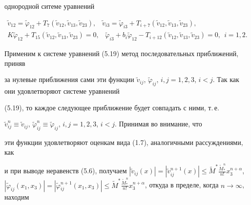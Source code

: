 однородной ситеме уравнений




\begin{equation}


\begin{array}{c}


\widetilde v_{12}=\widetilde \varphi_{12}+T_7(\widetilde v_{12},\widetilde


v_{13},\widetilde v_{23}),\;\;\;\widetilde v_{i3}=\widetilde \varphi_{i3}+


T_{i+7}(\widetilde v_{12},\widetilde v_{13},\widetilde v_{23}), \\[2mm]


K\widetilde \varphi_{12}+T_{15}(\widetilde v_{12},\widetilde v_{13},


\widetilde v_{23})=0,\;\;\;\widetilde \varphi_{i3}+b_i\widetilde \varphi_{12}-


T_{i+12}(\widetilde v_{12},\widetilde v_{13},\widetilde v_{23})=0,\ \ i=1,2.


\end{array}


\end{equation}


Применим к системе уравнений (5.19) метод последовательных приближений, приняв


за нулевые приближения сами эти функции $\widetilde v_{ij}$, $\widetilde


\varphi_{ij}$, $i,j=1,2,3$, $i<j$. Так как они удовлетворяют системе уравнений


(5.19), то каждое следующее приближение будет совпадать с ними, т.\,е.


$\widetilde v_{ij}^n \equiv \widetilde v_{ij}$, $\widetilde \varphi_{ij}^n


\equiv \widetilde \varphi_{ij}$, $i,j=1,2,3$, $i<j$. Принимая во внимание, что


эти функции удовлетворяют оценкам вида (1.7), аналогичными рассуждениями, как


и при выводе неравенств (5.6), получаем $|\widetilde v_{ij}(x)|=|\widetilde


v{}_{ij}^{n+1}(x)|\le {\widetilde M}^* \frac{{\widetilde M}_*^n}{n!}x_3^{n+


\alpha}$, $|\widetilde \varphi_{ij}(x_1,x_3)|=|\widetilde \varphi{}_{ij}^{n+


1}(x_1,x_3)|\leq {\widetilde M}^* \frac{{\widetilde M}_*^n}{n!}x_3^{n+


\alpha}$, откуда в пределе, когда $n \to \infty $, находим


